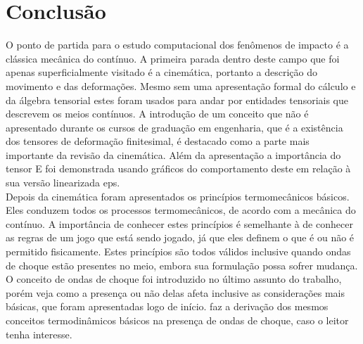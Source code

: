 \chapter{Conclusão}

O ponto de partida para o estudo computacional dos fenômenos de impacto é a clássica mecânica do contínuo. A primeira parada dentro deste campo que foi apenas superficialmente visitado é a cinemática, portanto a descrição do movimento e das deformações. Mesmo sem uma apresentação formal do cálculo e da álgebra tensorial estes foram usados para andar por entidades tensoriais que descrevem os meios contínuos. A introdução de um conceito que não é apresentado durante os cursos de graduação em engenharia, que é a existência dos tensores de deformação finitesimal, é destacado como a parte mais importante da revisão da cinemática. Além da apresentação a importância do tensor \gls{E} foi demonstrada usando gráficos do comportamento deste em relação à sua versão linearizada \gls{eps}. \\

Depois da cinemática foram apresentados os princípios termomecânicos básicos. Eles conduzem todos os processos termomecânicos, de acordo com a mecânica do contínuo. A importância de conhecer estes princípios é semelhante à de conhecer as regras de um jogo que está sendo jogado, já que eles definem o que é ou não é permitido fisicamente. Estes princípios são todos válidos inclusive quando ondas de choque estão presentes no meio, embora sua formulação possa sofrer mudança. O conceito de ondas de choque foi introduzido no último assunto do trabalho, porém veja como a presença ou não delas afeta inclusive as considerações mais básicas, que foram apresentadas logo de início. \cite{gurtin_fried_anand_2013} faz a derivação dos mesmos conceitos termodinâmicos básicos na presença de ondas de choque, caso o leitor tenha interesse. \\ 

